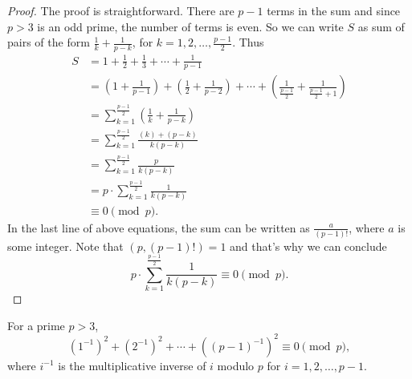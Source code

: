 \documentclass[12pt]{subfile}
\begin{document}
		\begin{proof}
			The proof is straightforward. There are $p-1$ terms in the sum and since $p>3$ is an odd prime, the number of terms is even. So we can write $S$ as sum of pairs of the form $ \frac{1}{k} +‌\frac{1}{p-k}$, for $k=1, 2, \ldots, \frac{p-1}{2}$. Thus
			\begin{align*}
				S
					&= 1+\frac{1}{2}+ \frac{1}{3}+\cdots+ \frac{1}{p-1}\\
					& = \left(1 + \frac{1}{p-1}\right) +‌\left(\frac{1}{2} + \frac{1}{p-2}\right) + \cdots + \left(\frac{1}{\frac{p-1}{2}} + \frac{1}{\frac{p-1}{2}+1}\right)\\
					& = \sum_{k=1}^{\frac{p-1}{2}} \left(\frac{1}{k}+\frac{1}{p-k} \right)\\
					& = \sum_{k=1}^{\frac{p-1}{2}} \frac{(k) + (p-k)}{k(p-k)}\\
					& = \sum_{k=1}^{\frac{p-1}{2}} \frac{p}{k(p-k)}\\
					& =p \cdot \sum_{k=1}^{\frac{p-1}{2}} \frac{1}{k(p-k)}\\ & \equiv 0 \pmod p.
			\end{align*}
			In the last line of above equations, the sum can be written as $\frac{a}{(p-1)!}$, where $a$ is some integer. Note that $(p, (p-1)!)=1$ and that's why we can conclude
				\begin{equation*}
					p \cdot \sum_{k=1}^{\frac{p-1}{2}} \frac{1}{k(p-k)} \equiv 0 \pmod p.
				\end{equation*}
		\end{proof}

		\begin{lemma}\label{lem:wolstproof2} For a prime $p>3$,
			\[(1^{-1})^2+(2^{-1})^2+\cdots+((p-1)^{-1})^2 \equiv 0 \pmod p,\] where $i^{-1}$ is the multiplicative inverse of $i$ modulo $p$ for $i=1,2,\ldots,p-1$.
		\end{lemma}
\end{document}
